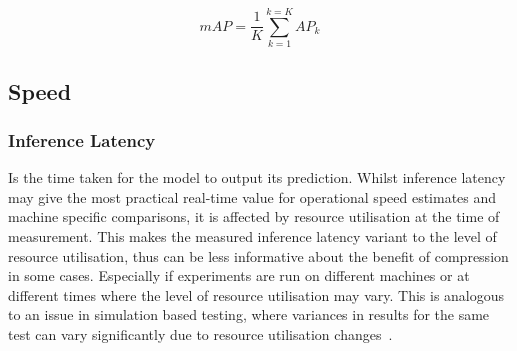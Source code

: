 \begin{equation}
    mAP = \frac{1}{K} \sum_{k=1}^{k=K} AP_k
    \label{eq:mAP}
\end{equation}

\subsection{Speed}
\subsubsection{Inference Latency} Is the time taken for the model to output its prediction. 
%
Whilst inference latency may give the most practical real-time value for operational speed estimates and machine specific comparisons, it is affected by resource utilisation at the time of measurement. 
%
This makes the measured inference latency variant to the level of resource utilisation, thus can be less informative about the benefit of compression in some cases. Especially if experiments are run on different machines or at different times where the level of resource utilisation may vary. 
%
This is analogous to an issue in simulation based testing, where variances in results for the same test can vary significantly due to resource utilisation changes~\cite{determinisim}.


